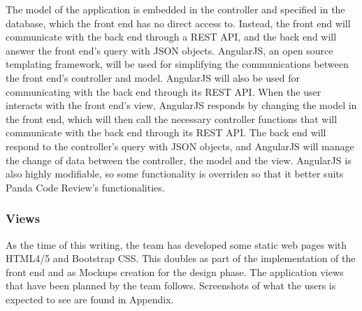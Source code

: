 The model of the application is embedded in the controller and specified in the
database, which the front end has no direct access to. Instead, the front end
will communicate with the back end through a REST API, and the back end will
answer the front end's query with JSON objects. AngularJS, an open source
templating framework, will be used for simplifying the communications between
the front end's controller and model. AngularJS will also be used for
communicating with the back end through its REST API. When the user interacts
with the front end's view, AngularJS responds by changing the model in the front
end, which will then call the necessary controller functions that will
communicate with the back end through its REST API. The back end will respond to
the controller's query with JSON objects, and AngularJS will manage the change
of data between the controller, the model and the view. AngularJS is also highly
modifiable, so some functionality is overriden so that it better suits Panda
Code Review's functionalities.

\subsubsection{Views}
As the time of this writing, the team has developed some static web pages with
HTML4/5 and Bootstrap CSS. This doubles as part of the implementation of the
front end and as Mockups creation for the design phase. The application views
that have been planned by the team follows. Screenshots of what the users is
expected to see are found in Appendix.


